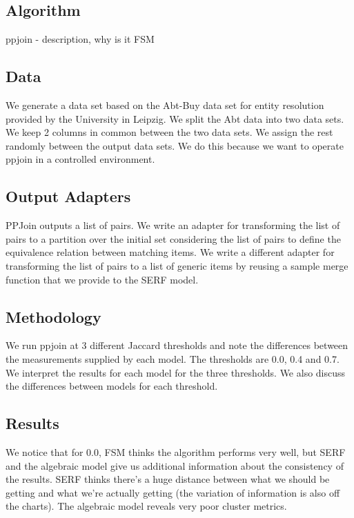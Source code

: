 \documentclass[11pt]{article}
\begin{document}
    \subsection[algo]{Algorithm}\label{subsec:algorithm}
    
    ppjoin - description, why is it FSM

    \subsection[data]{Data}\label{subsec:data}
    
    We generate a data set based on the Abt-Buy data set for entity resolution provided by the University in Leipzig. We split the Abt data into two data sets. We keep 2 columns in common between the two data sets. We assign the rest randomly between the output data sets. We do this because we want to operate ppjoin in a controlled environment.

    \subsection[adapters]{Output Adapters}\label{subsec:adapters}

    PPJoin outputs a list of pairs. We write an adapter for transforming the list of pairs to a partition over the initial set considering the list of pairs to define the equivalence relation between matching items. We write a different adapter for transforming the list of pairs to a list of generic items by reusing a sample merge function that we provide to the SERF model.

    \subsection[method]{Methodology}\label{subsec:methodology}

    We run ppjoin at 3 different Jaccard thresholds and note the differences between the measurements supplied by each model. The thresholds are 0.0, 0.4 and 0.7. We interpret the results for each model for the three thresholds. We also discuss the differences between models for each threshold.

    \subsection[results]{Results}\label{subsec:results}

    We notice that for 0.0, FSM thinks the algorithm performs very well, but SERF and the algebraic model give us additional information about the consistency of the results. 
    SERF thinks there's a huge distance between what we should be getting and what we're actually getting (the variation of information is also off the charts).
    The algebraic model reveals very poor cluster metrics.
\end{document}
